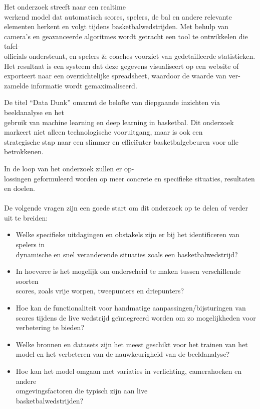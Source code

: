 Het onderzoek streeft naar een realtime \\werkend model dat automatisch scores, spelers, de bal en andere relevante elementen herkent en volgt tijdens basketbalwedstrijden. 
Met behulp van camera's en geavanceerde algoritmes wordt getracht een tool te ontwikkelen die tafel-\\officials ondersteunt, en spelers \& coaches voorziet van gedetailleerde statistieken. Het resultaat is een systeem dat deze gegevens visualiseert op een website of exporteert naar een overzichtelijke spreadsheet, waardoor de waarde van ver-\\zamelde informatie wordt gemaximaliseerd.

De titel ``Data Dunk'' omarmt de belofte van diepgaande inzichten via beeldanalyse en het \\gebruik van machine learning en deep learning in basketbal. Dit onderzoek markeert niet alleen technologische vooruitgang, maar is ook een \\strategische stap naar een slimmer en efficiënter basketbalgebeuren voor alle betrokkenen.

In de loop van het onderzoek zullen er op-\\lossingen geformuleerd worden op meer concrete en specifieke situaties, resultaten en doelen. 
\\\\De volgende vragen zijn een goede start om dit onderzoek op te delen of verder uit te breiden:
\begin{itemize}
    \item Welke specifieke uitdagingen en obstakels zijn er bij het identificeren van spelers in \\dynamische en snel veranderende situaties zoals een basketbalwedstrijd?
    \item In hoeverre is het mogelijk om onderscheid te maken tussen verschillende soorten \\scores, zoals vrije worpen, tweepunters en driepunters?
    \item Hoe kan de functionaliteit voor handmatige aanpassingen/bijsturingen van scores tijdens de live wedstrijd geïntegreerd worden om zo mogelijkheden voor verbetering te bieden?
    \item Welke bronnen en datasets zijn het meest geschikt voor het trainen van het model en het verbeteren van de nauwkeurigheid van de beeldanalyse?
    \item Hoe kan het model omgaan met variaties in verlichting, camerahoeken en andere \\omgevingsfactoren die typisch zijn aan live \\basketbalwedstrijden?
\end{itemize}


